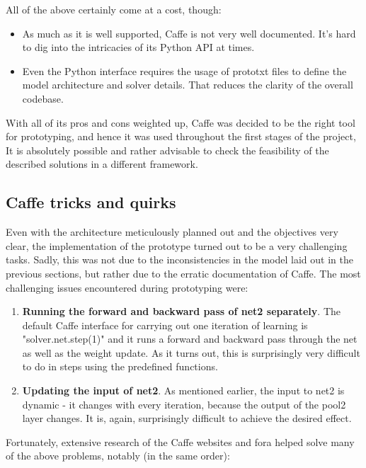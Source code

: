 \documentclass[a4paper, 12pt]{article}
\numberwithin{equation}{section}
\begin{document}
	All of the above certainly come at a cost, though:

	\begin{itemize}
		\item As much as it is well supported, Caffe is not very well documented. It's hard to dig into the intricacies of its Python API at times.
		\item Even the Python interface requires the usage of prototxt files to define the model architecture and solver details. That reduces the clarity of the overall codebase.
	\end{itemize}

	With all of its pros and cons weighted up, Caffe was decided to be the right tool for prototyping, and hence it was used throughout the first stages of the project, It is absolutely possible and rather advisable to check the feasibility of the described solutions in a different framework.

	\subsection{Caffe tricks and quirks} \label{sec:caffe_tricks}

	Even with the architecture meticulously planned out and the objectives very clear, the implementation of the prototype turned out to be a very challenging tasks. Sadly, this was not due to the inconsistencies in the model laid out in the previous sections, but rather due to the erratic documentation of Caffe. The most challenging issues encountered during prototyping were:

	\begin{enumerate}
		\item \textbf{Running the forward and backward pass of net2 separately}. The default Caffe interface for carrying out one iteration of learning is "solver.net.step(1)" and it runs a forward and backward pass through the net as well as the weight update. As it turns out, this is surprisingly very difficult to do in steps using the predefined functions.
		\item \textbf{Updating the input of net2}. As mentioned earlier, the input to net2 is dynamic - it changes with every iteration, because the output of the pool2 layer changes. It is, again, surprisingly difficult to achieve the desired effect.
	\end{enumerate}

	Fortunately, extensive research of the Caffe websites and fora helped solve many of the above problems, notably (in the same order):
\end{document}
